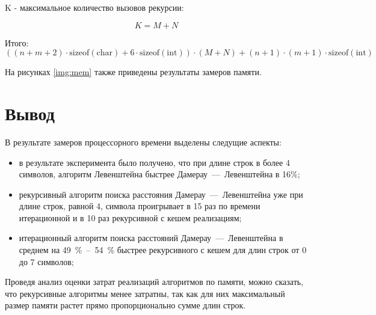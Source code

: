 K - максимальное количество вызовов рекурсии:

\begin{equation}
	K = M + N
\end{equation}

Итого:
\begin{equation}
	\label{eq:memDLcache}
	((n + m + 2) \cdot \text{sizeof}(\text{char}) + 6 \cdot \text{sizeof}(\text{int})) \cdot (M + N) + (n + 1) \cdot (m + 1) \cdot \text{sizeof}(\text{int})
\end{equation}


На рисунках \ref{img:mem} также приведены результаты замеров памяти. 

\clearpage
{}

\section{Вывод}

В результате замеров процессорного времени выделены следущие аспекты:
\begin{itemize}
    \item в результате эксперимента было получено, что при длине строк в более 4
    символов, алгоритм Левенштейна быстрее Дамерау~---~Левенштейна в 16\%;
    \item рекурсивный алгоритм поиска расстояния Дамерау~---~Левенштейна уже при длине строк, равной 4, символа проигрывает в 15 раз по времени итерационной и в 10 раз рекурсивной с кешем реализациям;
    \item итерационный алгоритм поиска расстояний Дамерау~---~Левенштейна в среднем на 49~\%~--~54~\% быстрее рекурсивного с кешем для длин строк от 0 до 7 символов;
\end{itemize}

Проведя анализ оценки затрат реализаций алгоритмов по памяти, можно сказать, что рекурсивные алгоритмы менее затратны, так как для них максимальный размер памяти растет прямо пропорционально сумме длин строк.

